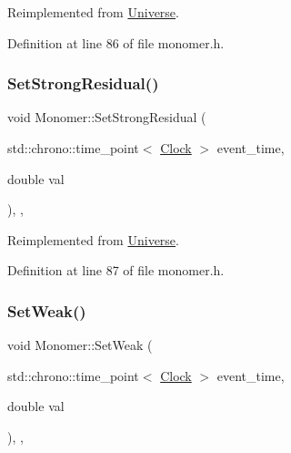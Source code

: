 Reimplemented from \hyperlink{class_universe_aafec97a231126b71c73ac1258609a284}{Universe}.



Definition at line 86 of file monomer.\+h.

\mbox{\label{class_monomer_ae6ca57913da27fa749d33d1c4fed27ca}} 
\subsubsection{\texorpdfstring{Set\+Strong\+Residual()}{SetStrongResidual()}}
{\footnotesize\ttfamily void Monomer\+::\+Set\+Strong\+Residual (\begin{DoxyParamCaption}\item[{std\+::chrono\+::time\+\_\+point$<$ \hyperlink{universe_8h_a0ef8d951d1ca5ab3cfaf7ab4c7a6fd80}{Clock} $>$}]{event\+\_\+time,  }\item[{double}]{val }\end{DoxyParamCaption})\hspace{0.3cm}{\ttfamily [inline]}, {\ttfamily [final]}, {\ttfamily [virtual]}}



Reimplemented from \hyperlink{class_universe_a1b2d6197ddf3d613cc30bd04d22ed8b7}{Universe}.



Definition at line 87 of file monomer.\+h.

\mbox{\label{class_monomer_ad4fe1db33f493575281e1a2fb35004ca}} 
\subsubsection{\texorpdfstring{Set\+Weak()}{SetWeak()}}
{\footnotesize\ttfamily void Monomer\+::\+Set\+Weak (\begin{DoxyParamCaption}\item[{std\+::chrono\+::time\+\_\+point$<$ \hyperlink{universe_8h_a0ef8d951d1ca5ab3cfaf7ab4c7a6fd80}{Clock} $>$}]{event\+\_\+time,  }\item[{double}]{val }\end{DoxyParamCaption})\hspace{0.3cm}{\ttfamily [inline]}, {\ttfamily [final]}, {\ttfamily [virtual]}}



